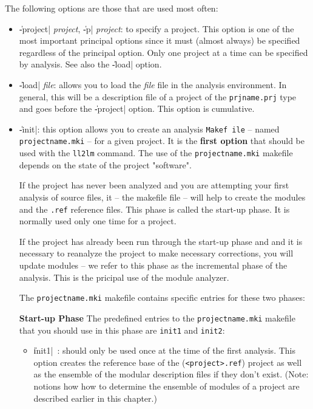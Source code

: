 The following options are those that are used most often:
\begin{itemize}

\item {\Large \|-project| {\em project}, \|-p| {\em project}}:
to specify a project.  This option is one of the most important principal 
options since it must (almost always) be specified regardless of the principal option.
Only one project at a time can be specified by analysis. 
See also the \|-load| 
option.

\item {\Large \|-load| {\em file}}: allows you to load the {\em file} file
in the analysis environment.  In general, this will be a description file of a project of the {\tt prjname.prj} type and goes before the \|-project| option.
This option is cumulative.

\item {\Large \|-init|}: 
this option allows you to create an analysis {\tt Makef
ile} -- named {\tt
projectname.mki} -- for a given project.
It is the {\bf first option} that should be used with the {\tt ll2lm} command.  The use of the {\tt projectname.mki} makefile depends on the state of the project "software".

If the project has never been analyzed and you are attempting your first analysis of source files, it -- the makefile file -- will help to create the modules and the {\tt *.ref} reference files.  This phase is called the start-up phase.  It is normally used only one time for a project. 

If the project has already been run through the start-up phase and and it is necessary to reanalyze the project to make necessary corrections, you will update modules -- we refer to this phase as the incremental phase of the analysis. 
This is the pricipal use of the module analyzer.

The {\tt projectname.mki} makefile contains specific entries for these two phases:

\begin{Side}{\bf Start-up Phase}
The predefined entries to the {\tt projectname.mki} makefile that you should use in this phase are {\tt init1} and {\tt init2}:
\end{Side}

\begin{itemize}
\item \|init1| \,:  should only be used once at the time of the first analysis.  This option creates the reference base of the ({\tt <project>.ref}) project as well as the ensemble of the modular description files if they don't exist.   
(Note:  notions how how to determine the ensemble of modules of a project are described earlier in this chapter.)


\end{itemize}
\end{itemize}
